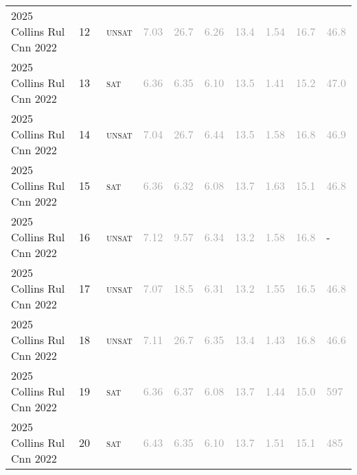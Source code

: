 \begin{center}
{\begin{longtable}{@{}llllllllll@{}}
2025 Collins Rul Cnn 2022 & 12 & ~\textsc{unsat} & \textcolor{darkgray}{7.03} & \textcolor{darkgray}{26.7} & \textcolor{darkgray}{6.26} & \textcolor{darkgray}{13.4} & \textcolor{darkgray}{1.54} & \textcolor{darkgray}{16.7} & \textcolor{darkgray}{46.8} \\
2025 Collins Rul Cnn 2022 & 13 & ~\textsc{sat} & \textcolor{darkgray}{6.36} & \textcolor{darkgray}{6.35} & \textcolor{darkgray}{6.10} & \textcolor{darkgray}{13.5} & \textcolor{darkgray}{1.41} & \textcolor{darkgray}{15.2} & \textcolor{darkgray}{47.0} \\
2025 Collins Rul Cnn 2022 & 14 & ~\textsc{unsat} & \textcolor{darkgray}{7.04} & \textcolor{darkgray}{26.7} & \textcolor{darkgray}{6.44} & \textcolor{darkgray}{13.5} & \textcolor{darkgray}{1.58} & \textcolor{darkgray}{16.8} & \textcolor{darkgray}{46.9} \\
2025 Collins Rul Cnn 2022 & 15 & ~\textsc{sat} & \textcolor{darkgray}{6.36} & \textcolor{darkgray}{6.32} & \textcolor{darkgray}{6.08} & \textcolor{darkgray}{13.7} & \textcolor{darkgray}{1.63} & \textcolor{darkgray}{15.1} & \textcolor{darkgray}{46.8} \\
2025 Collins Rul Cnn 2022 & 16 & ~\textsc{unsat} & \textcolor{darkgray}{7.12} & \textcolor{darkgray}{9.57} & \textcolor{darkgray}{6.34} & \textcolor{darkgray}{13.2} & \textcolor{darkgray}{1.58} & \textcolor{darkgray}{16.8} & - \\
2025 Collins Rul Cnn 2022 & 17 & ~\textsc{unsat} & \textcolor{darkgray}{7.07} & \textcolor{darkgray}{18.5} & \textcolor{darkgray}{6.31} & \textcolor{darkgray}{13.2} & \textcolor{darkgray}{1.55} & \textcolor{darkgray}{16.5} & \textcolor{darkgray}{46.8} \\
2025 Collins Rul Cnn 2022 & 18 & ~\textsc{unsat} & \textcolor{darkgray}{7.11} & \textcolor{darkgray}{26.7} & \textcolor{darkgray}{6.35} & \textcolor{darkgray}{13.4} & \textcolor{darkgray}{1.43} & \textcolor{darkgray}{16.8} & \textcolor{darkgray}{46.6} \\
2025 Collins Rul Cnn 2022 & 19 & ~\textsc{sat} & \textcolor{darkgray}{6.36} & \textcolor{darkgray}{6.37} & \textcolor{darkgray}{6.08} & \textcolor{darkgray}{13.7} & \textcolor{darkgray}{1.44} & \textcolor{darkgray}{15.0} & \textcolor{darkgray}{597} \\
2025 Collins Rul Cnn 2022 & 20 & ~\textsc{sat} & \textcolor{darkgray}{6.43} & \textcolor{darkgray}{6.35} & \textcolor{darkgray}{6.10} & \textcolor{darkgray}{13.7} & \textcolor{darkgray}{1.51} & \textcolor{darkgray}{15.1} & \textcolor{darkgray}{485} \\

\end{longtable}}
\end{center}
